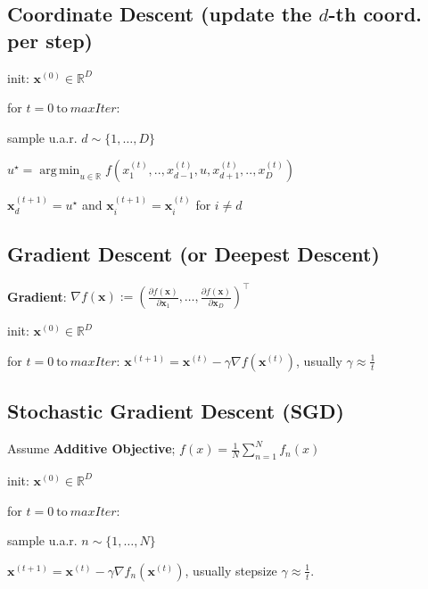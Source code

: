 \documentclass[a4paper, 11pt, landscape]{article}
\DeclareMathOperator*{\argmin}{arg\,min}
\begin{document}
\begin{multicols*}{3}
    \subsection{Coordinate Descent (update the $d$-th coord. per step)}
    \begin{inparaenum}
    \item init: $\mathbf{x}^{(0)} \in \mathbb{R}^D$
    \item for $t = 0 \ \text{to} \ \mathit{maxIter}$:
    \item sample u.a.r. $d \sim \{1, \ldots, D\}$
    \item $u^\star = \argmin_{u \in \mathbb{R}} f(x_1^{(t)}, .., x_{d-1}^{(t)}, u, x_{d+1}^{(t)}, .., x_D^{(t)})$
    \item $\mathbf{x}_d^{(t+1)} = u^\star$ and $\mathbf{x}_i^{(t+1)} = \mathbf{x}_i^{(t)}$ for $i \neq d$
    \end{inparaenum}

    \subsection{Gradient Descent (or Deepest Descent)}
    \textbf{Gradient}: $\nabla f(\mathbf{x}) := \left( \frac{\partial f(\mathbf{x})}{\partial \mathbf{x}_1}, \ldots, \frac{\partial f(\mathbf{x})}{\partial \mathbf{x}_D} \right)^\top$
    \begin{inparaenum}
    \item init: $\mathbf{x}^{(0)} \in \mathbb{R}^D$
    \item for $t = 0 \ \text{to} \ \mathit{maxIter}$: $\mathbf{x}^{(t+1)} = \mathbf{x}^{(t)} - \gamma \nabla f(\mathbf{x}^{(t)})$, usually $\gamma \approx \frac{1}{t}$
    \end{inparaenum}

    \subsection{Stochastic Gradient Descent (SGD)}
    Assume \textbf{Additive Objective}; $f(x) = \frac{1}{N}\sum_{n=1}^{N}f_n(x)$
    \begin{inparaenum}
    \item init: $\mathbf{x}^{(0)} \in \mathbb{R}^D$
    \item for $t = 0 \ \text{to} \ \mathit{maxIter}$:
    \item sample u.a.r. $n \sim \{1, \ldots, N\}$
    \item $\mathbf{x}^{(t+1)} = \mathbf{x}^{(t)} - \gamma \nabla f_n(\mathbf{x}^{(t)})$, usually stepsize $\gamma \approx \frac{1}{t}$. 
    \end{inparaenum}


\end{multicols*}
\end{document}
